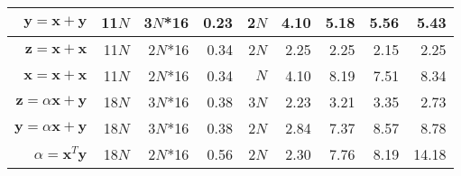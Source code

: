 \documentclass{IOS-Book-Article}
\begin{document}
{\begin{table}[htbp]
\begin{tabular}{r||r|r|r|r|r|r|r|r}
                      $\bm{y} = \bm{x}+\bm{y}$& 11$N$                                                                 & 3$N$*16                                                       & 0.23                                                            & 2$N$                                                           & 4.10                     & 5.18                     & 5.56                     & 5.43                                                    \\ \hline
                      $\bm{z} = \bm{x}+\bm{x}$& 11$N$                                                                 & 2$N$*16                                                       & 0.34                                                            & 2$N$                                                           & 2.25                     & 2.25                     & 2.15                     & 2.25                                                    \\ \hline
                      $\bm{x} = \bm{x}+\bm{x}$& 11$N$                                                                 & 2$N$*16                                                       & 0.34                                                            & $N$                                                            & 4.10                     & 8.19                     & 7.51                     & 8.34                                                    \\ \hline
                      $\bm{z} = \alpha\bm{x}+\bm{y}$& 18$N$                                                                 & 3$N$*16                                                       & 0.38                                                            & 3$N$                                                           & 2.23                     & 3.21                     & 3.35                     & 2.73                                                    \\ \hline
                      $\bm{y} = \alpha\bm{x}+\bm{y}$& 18$N$                                                                 & 3$N$*16                                                       & 0.38                                                            & 2$N$                                                           & 2.84                     & 7.37                     & 8.57                     & 8.78                                                    \\ \hline
                      $\alpha = \bm{x}^T\bm{y}$& 18$N$                                                                 & 2$N$*16                                                       & 0.56                                                            & 2$N$                                                           & 2.30                     & 7.76                     & 8.19                     & 14.18                                                   \\ \hline

\end{tabular}
\end{table}}
\end{document}
